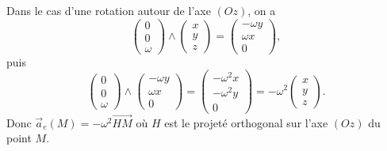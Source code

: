             \begin{example}
                Dans le cas d'une rotation autour de l'axe $(Oz)$, on a 
                \begin{equation}
                    \begin{pmatrix}
                        0\\0\\\omega
                    \end{pmatrix}\wedge\begin{pmatrix}
                        x\\y\\z
                    \end{pmatrix}=\begin{pmatrix}
                        -\omega y\\\omega x\\0
                    \end{pmatrix},
                \end{equation}
                puis
                \begin{equation}
                    \begin{pmatrix}
                        0\\0\\\omega
                    \end{pmatrix}\wedge\begin{pmatrix}
                        -\omega y\\\omega x\\0
                    \end{pmatrix}=\begin{pmatrix}
                        -\omega^{2}x\\-\omega^{2}y\\0
                    \end{pmatrix}=-\omega^{2}\begin{pmatrix}
                        x\\y\\z
                    \end{pmatrix}.
                \end{equation}
                Donc $\vec{a}_e(M)=-\omega^{2}\vec{HM}$ où $H$ est le projeté orthogonal sur l'axe $(Oz)$ du point $M$.
            \end{example}
